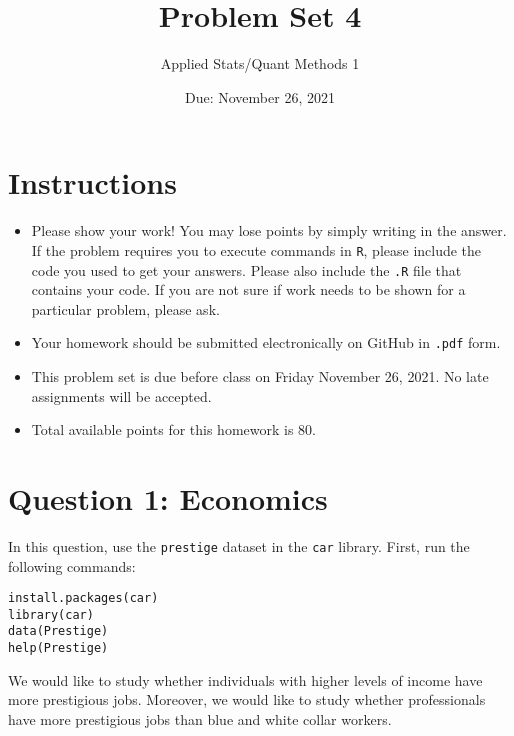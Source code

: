\documentclass[12pt,letterpaper]{article}
\title{Problem Set 4}
\date{Due: November 26, 2021}
\author{Applied Stats/Quant Methods 1}
\begin{document}
	\maketitle
	\section*{Instructions}
	\begin{itemize}
		\item Please show your work! You may lose points by simply writing in the answer. If the problem requires you to execute commands in \texttt{R}, please include the code you used to get your answers. Please also include the \texttt{.R} file that contains your code. If you are not sure if work needs to be shown for a particular problem, please ask.
		\item Your homework should be submitted electronically on GitHub in \texttt{.pdf} form.
		\item This problem set is due before class on Friday November 26, 2021. No late assignments will be accepted.
		\item Total available points for this homework is 80.
	\end{itemize}



	\vspace{.5cm}
\section*{Question 1: Economics}
\vspace{.25cm}
\noindent 	
In this question, use the \texttt{prestige} dataset in the \texttt{car} library. First, run the following commands:

\begin{verbatim}
install.packages(car)
library(car)
data(Prestige)
help(Prestige)
\end{verbatim} 


\noindent We would like to study whether individuals with higher levels of income have more prestigious jobs. Moreover, we would like to study whether professionals have more prestigious jobs than blue and white collar workers.
\end{document}
